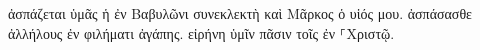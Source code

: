 \documentclass{openreader}
\begin{document}
ἀσπάζεται ὑμᾶς ἡ ἐν Βαβυλῶνι συνεκλεκτὴ καὶ Μᾶρκος ὁ υἱός μου. 
ἀσπάσασθε ἀλλήλους ἐν φιλήματι ἀγάπης. εἰρήνη ὑμῖν πᾶσιν τοῖς ἐν ⸀Χριστῷ. 
\end{document}
